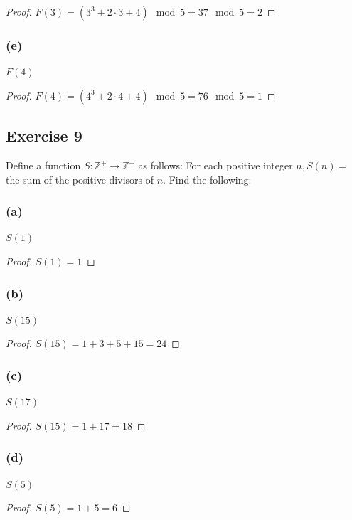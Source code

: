 \documentclass[14pt]{extarticle}
\newcommand{\Z}{\mathbb{Z}}
\begin{document}
\begin{proof}
\(F(3) = (3^3 + 2 \cdot 3 + 4) \mod 5 = 37 \mod 5 = 2\)
\end{proof}

\subsubsection{(e)}
$F(4)$

\begin{proof}
\(F(4) = (4^3 + 2 \cdot 4 + 4) \mod 5 = 76 \mod 5 = 1\)
\end{proof}

\subsection{Exercise 9}
Define a function \(S: \Z^+ \to \Z^+\) as follows: For each positive integer \(n, S(n) =\) the sum of the positive 
divisors of $n$. Find the following:

\subsubsection{(a)}
$S(1)$

\begin{proof}
$S(1) = 1$

\end{proof}

\subsubsection{(b)}
$S(15)$

\begin{proof}
\(S(15) = 1 + 3 + 5 + 15 = 24\)
\end{proof}

\subsubsection{(c)}
$S(17)$

\begin{proof}
\(S(15) = 1 + 17 = 18\)
\end{proof}

\subsubsection{(d)}
$S(5)$

\begin{proof}
\(S(5) = 1 + 5 = 6\)
\end{proof}
\end{document}
